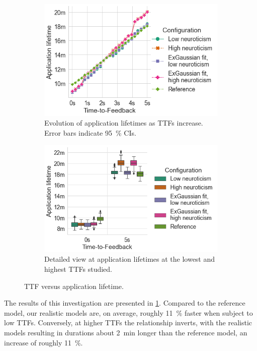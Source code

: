 \begin{figure}
    \centering
    \begin{subfigure}[]{\columnwidth}
        \centering
        \includegraphics[width=.9\textwidth]{figs/new_model/lifetime_all_ttfs.png}
        \caption{%
            Evolution of application lifetimes as \acp{TTF} increase.
            Error bars indicate \SI{95}{\percent} \acp{CI}.
        }
    \end{subfigure}
    \begin{subfigure}[]{\columnwidth}
        \centering
        \includegraphics[width=.9\textwidth]{figs/new_model/lifetime_minmax.png}
        \caption{Detailed view at application lifetimes at the lowest and highest \acp{TTF} studied.}
    \end{subfigure}
    \caption{\acl{TTF} versus application lifetime.}\label{fig:lifetimes}
\end{figure}

The results of this investigation are presented in \cref{fig:lifetimes}.
Compared to the reference model, our realistic models are, on average, roughly \SI{11}{\percent} faster when subject to low \acp{TTF}.
Conversely, at higher \acp{TTF} the relationship inverts, with the realistic models resulting in durations about \SI{2}{\minute} longer than the reference model, an increase of roughly \SI{11}{\percent}.

